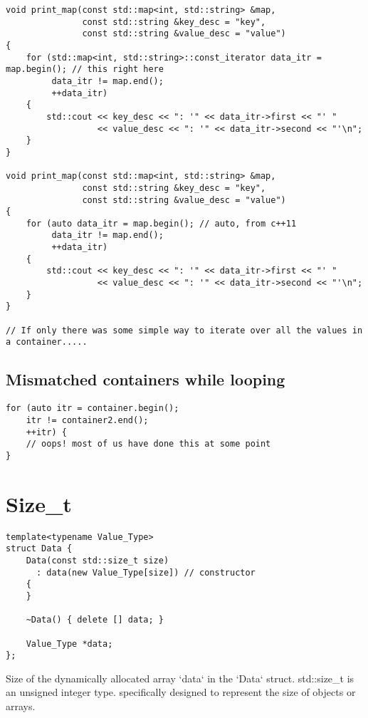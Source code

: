 \documentclass[openany]{report}
\begin{document}
\begin{verbatim}
void print_map(const std::map<int, std::string> &map,
               const std::string &key_desc = "key",
               const std::string &value_desc = "value")
{
    for (std::map<int, std::string>::const_iterator data_itr = map.begin(); // this right here
         data_itr != map.end();
         ++data_itr)
    {
        std::cout << key_desc << ": '" << data_itr->first << "' "
                  << value_desc << ": '" << data_itr->second << "'\n";
    }
}

void print_map(const std::map<int, std::string> &map,
               const std::string &key_desc = "key",
               const std::string &value_desc = "value")
{
    for (auto data_itr = map.begin(); // auto, from c++11
         data_itr != map.end();
         ++data_itr)
    {
        std::cout << key_desc << ": '" << data_itr->first << "' "
                  << value_desc << ": '" << data_itr->second << "'\n";
    }
}

// If only there was some simple way to iterate over all the values in a container.....
\end{verbatim}

\subsection{Mismatched containers while looping}

\begin{verbatim}
for (auto itr = container.begin();
    itr != container2.end();
    ++itr) {
    // oops! most of us have done this at some point
}
\end{verbatim}

\section{Size\_t}

\begin{verbatim}
template<typename Value_Type>
struct Data {
    Data(const std::size_t size)
      : data(new Value_Type[size]) // constructor
    {
    }

    ~Data() { delete [] data; }

    Value_Type *data;
};
\end{verbatim}

Size of the dynamically allocated array `data` in the `Data` struct. 
std::size\_t is an unsigned integer type.
specifically designed to represent the size of objects or arrays. 
\end{document}
